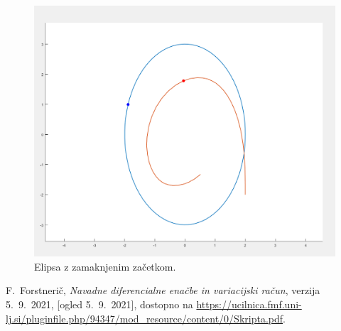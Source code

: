 \documentclass[mat1,reqno]{fmfdelo}
\begin{document}
\begin{figure}[!h]
\centering
\includegraphics[scale=0.2]{Elipsa z zamaknjenim začetkom}\\
Elipsa z zamaknjenim začetkom.
\end{figure}



\newpage

\begin{thebibliography}{99}

F.~Forstnerič, \emph{Navadne diferencialne enačbe in variacijski račun}, verzija 5.~9.~2021, [ogled 5.~9.~2021], dostopno na \url{https://ucilnica.fmf.uni-lj.si/pluginfile.php/94347/mod_resource/content/0/Skripta.pdf}.

\end{thebibliography}
\end{document}
